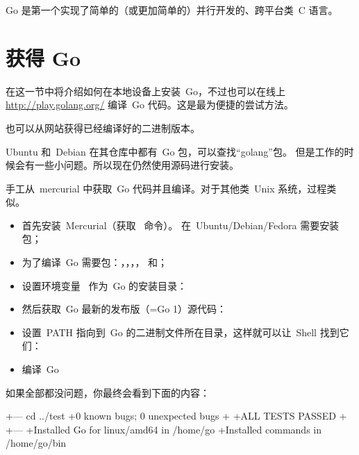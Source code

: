 \begin{lbar}[]
Go 是第一个实现了简单的（或更加简单的）并行开发的、跨平台类~C 语言。
\end{lbar}

\section{获得 Go}
在这一节中将介绍如何在本地设备上安装~Go，不过也可以在线上 \url{http://play.golang.org/} 编译~Go 代码。这是最为便捷的尝试方法。

也可以从网站\cite{go_install}获得已经编译好的二进制版本。

Ubuntu 和~Debian 在其仓库中都有~Go 包，可以查找``golang''包。
但是工作的时候会有一些小问题。所以现在仍然使用源码进行安装。

手工从~mercurial 中获取~Go 代码并且编译。对于其他类~Unix 系统，过程类似。
\begin{itemize}
\item 首先安装~Mercurial（获取~ 命令）。
在~Ubuntu/Debian/Fedora 需要安装~ 包；

\item 为了编译~Go 需要包：，，，， 和；

\item 设置环境变量~ 作为~Go 的安装目录：
\begin{display}
\pr {}
\end{display}

\item 然后获取~Go 最新的发布版（=Go 1）源代码：
\begin{display}
\pr {}
\end{display}

\item 设置~PATH 指向到~Go 的二进制文件所在目录，这样就可以让~Shell 找到它们：
\begin{display}
\pr {}
\end{display}

\item 编译~Go
\begin{display}
\pr {}
\pr {}
\end{display}
\end{itemize}
如果全部都没问题，你最终会看到下面的内容：
\begin{display}
+--- cd ../test
+0 known bugs; 0 unexpected bugs
+
+ALL TESTS PASSED
+
+---
+Installed Go for linux/amd64 in /home/go
+Installed commands in /home/go/bin
\end{display}

